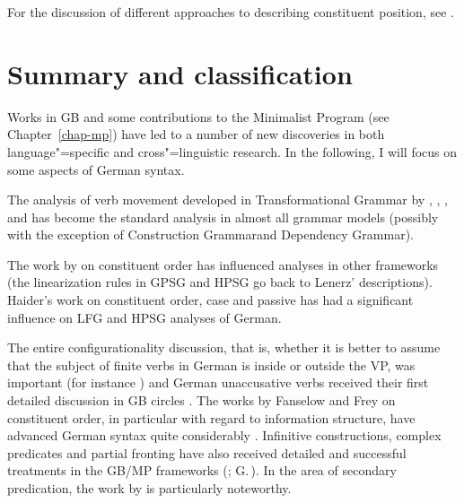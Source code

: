 For the discussion of different approaches to describing constituent position, see 
.




\section{Summary and classification}
\label{sec-summary-gb}

Works in GB and some contributions to the Minimalist Program (see Chapter~\ref{chap-mp}) have led to a number of new discoveries in both language"=specific and cross"=linguistic research. In
the following, I will focus on some aspects of German syntax.

The analysis of verb movement developed in Transformational Grammar by \citet*[]{Bierwisch63}, \citet{Reis74a},
\citet{Koster75a}, \citet[Chapter~1]{Thiersch78a} and \citet{denBesten83a} has become the standard analysis in almost
all grammar models (possibly with the exception of Construction Grammar\indexcxg and Dependency Grammar\indexdg).

The work by \citet{Lenerz77} on constituent order has influenced analyses in other frameworks
(the linearization rules in GPSG and HPSG go back to Lenerz' descriptions). Hai\-der's work on constituent order,
case and passive \citeyearpar{Haider84b,Haider85,Haider85b,Haider86,Haider90a,Haider93a} has had a significant influence on LFG
and HPSG analyses of German.

The entire configurationality discussion, that is, whether it is better to assume that the 
subject of finite verbs in German is inside or outside the VP, was important
(for instance \citealp*{Haider82,Grewendorf83a,Kratzer84a,Kratzer96a,Webelhuth85a,%
Sternefeld85b,%
Scherpenisse86a,%
Fanselow87a,Grewendorf88a,Duerscheid89a,Webelhuth90,%
Oppenrieder91a,%
Wilder91a,Haider93a,Grewendorf93,%
Frey93a,%
Lenerz94a,%
Meinunger2000a%
}) and German unaccusative verbs received their first detailed discussion in GB circles 
\citep{Grewendorf89a,Fanselow92}. The works by Fanselow and Frey on constituent order, in 
particular with regard to information structure, have advanced German syntax quite considerably
\citep{Fanselow88,Fanselow90,Fanselow93a,Fanselow2000a,Fanselow2001a,Fanselow2003d,Fanselow2003a,Fanselow2004a,Frey2000a-u,Frey2001a,Frey2004a,Frey2005a}.
Infinitive constructions, complex predicates and partial fronting have also received detailed and successful treatments
in the GB/MP frameworks
(\citealp{Bierwisch63,Evers75a,Haider82,Haider86c,Haider90b,Haider91,Haider93a,Grewendorf83a,Grewendorf87a,Grewendorf88a,denBesten85b,Sternefeld85b,Fanselow87a,Fanselow2002a,SS88a,BK89a}; G.\,\citealp{GMueller96a,GMueller98a,VS98a}).
In the area of secondary predication, the work by \citet{Winkler97a} is particularly noteworthy.

